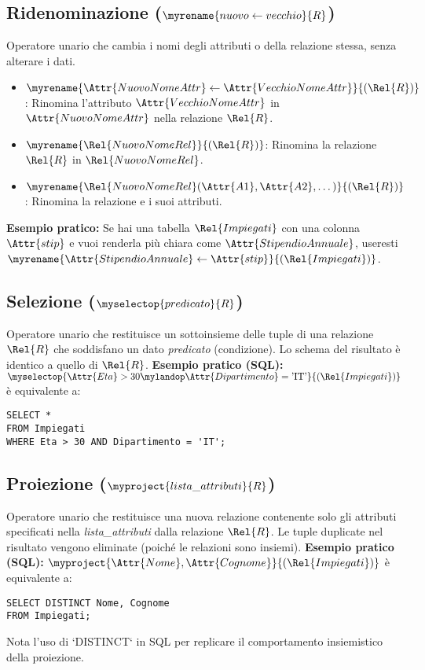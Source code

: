 \subsection{Ridenominazione ($\myrename{nuovo \leftarrow vecchio}{R}$)}
Operatore unario che cambia i nomi degli attributi o della relazione stessa, senza alterare i dati.
\begin{itemize}
	\item $\myrename{\Attr{NuovoNomeAttr} \leftarrow \Attr{VecchioNomeAttr}}{(\Rel{R})}$: Rinomina l'attributo $\Attr{VecchioNomeAttr}$ in $\Attr{NuovoNomeAttr}$ nella relazione $\Rel{R}$.
	\item $\myrename{\Rel{NuovoNomeRel}}{(\Rel{R})}$: Rinomina la relazione $\Rel{R}$ in $\Rel{NuovoNomeRel}$.
	\item $\myrename{\Rel{NuovoNomeRel}(\Attr{A1}, \Attr{A2}, \dots)}{(\Rel{R})}$: Rinomina la relazione e i suoi attributi.
\end{itemize}
\textbf{Esempio pratico:} Se hai una tabella $\Rel{Impiegati}$ con una colonna $\Attr{stip}$ e vuoi renderla più chiara come $\Attr{StipendioAnnuale}$, useresti $\myrename{\Attr{StipendioAnnuale} \leftarrow \Attr{stip}}{(\Rel{Impiegati})}$.

\subsection{Selezione ($\myselectop{predicato}{R}$)}
Operatore unario che restituisce un sottoinsieme delle tuple di una relazione $\Rel{R}$ che soddisfano un dato \textit{predicato} (condizione).
Lo schema del risultato è identico a quello di $\Rel{R}$.
\textbf{Esempio pratico (SQL):}
$\myselectop{\Attr{Eta} > 30 \mylandop \Attr{Dipartimento} = \text{'IT'}}{(\Rel{Impiegati})}$
è equivalente a:
\begin{verbatim}
SELECT *
FROM Impiegati
WHERE Eta > 30 AND Dipartimento = 'IT';
\end{verbatim}

\subsection{Proiezione ($\myproject{lista\_attributi}{R}$)}
Operatore unario che restituisce una nuova relazione contenente solo gli attributi specificati nella \textit{lista\_attributi} dalla relazione $\Rel{R}$.
Le tuple duplicate nel risultato vengono eliminate (poiché le relazioni sono insiemi).
\textbf{Esempio pratico (SQL):}
$\myproject{\Attr{Nome}, \Attr{Cognome}}{(\Rel{Impiegati})}$
è equivalente a:
\begin{verbatim}
SELECT DISTINCT Nome, Cognome
FROM Impiegati;
\end{verbatim}
Nota l'uso di `DISTINCT` in SQL per replicare il comportamento insiemistico della proiezione.

